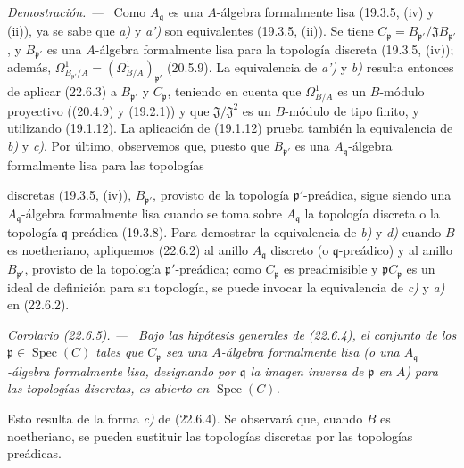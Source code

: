 \documentclass[10pt,oneside]{book}
\makeatletter
\newcommand{\setmanualcurrentlabel}[1]{\def\@currentlabel{#1}}
\newcommand{\oldpage}[2][]{%
  \setcounter{footnote}{0}%
  \marginpar{\scriptsize\textbf{#1}~|~#2}\ignorespaces}
\newenvironment{corollary}[1][]{%
  \setmanualcurrentlabel{#1}\par\medskip\noindent\itshape Corolario (#1). ---\ }{\par}
\newenvironment{proof}{%
  \par\medskip\noindent\textit{Demostración. ---\ }}{\par}
\makeatother
\begin{document}
\begin{proof}
Como $A_{\mathfrak q}$ es una $A$-álgebra formalmente lisa (19.3.5, (iv)
y (ii)), ya se sabe que \emph{a)} y \emph{a')} son equivalentes (19.3.5, (ii)). Se tiene
$C_{\mathfrak p}=B_{\mathfrak p'}/\mathfrak J B_{\mathfrak p'}$, y
$B_{\mathfrak p'}$ es una $A$-álgebra formalmente lisa para la topología
discreta (19.3.5, (iv)); además,
$\Omega^1_{B_{\mathfrak p'}/A}=(\Omega^1_{B/A})_{\mathfrak p'}$ (20.5.9).
La equivalencia de \emph{a')} y \emph{b)} resulta entonces de aplicar (22.6.3) a
$B_{\mathfrak p'}$ y $C_{\mathfrak p}$, teniendo en cuenta que
$\Omega^1_{B/A}$ es un $B$-módulo proyectivo ((20.4.9) y (19.2.1)) y que
$\mathfrak J/\mathfrak J^2$ es un $B$-módulo de tipo finito, y utilizando
(19.1.12). La aplicación de (19.1.12) prueba también la equivalencia de \emph{b)} y \emph{c)}.
Por último, observemos que, puesto que $B_{\mathfrak p'}$ es una
$A_{\mathfrak q}$-álgebra formalmente lisa para las topologías

\oldpage[0\textsubscript{IV-1}]{207}

discretas (19.3.5, (iv)), $B_{\mathfrak p'}$, provisto de la topología
$\mathfrak p'$-preádica, sigue siendo una $A_{\mathfrak q}$-álgebra
formalmente lisa cuando se toma sobre $A_{\mathfrak q}$ la topología
discreta o la topología $\mathfrak q$-preádica (19.3.8). Para demostrar
la equivalencia de \emph{b)} y \emph{d)} cuando $B$ es noetheriano, apliquemos (22.6.2) al
anillo $A_{\mathfrak q}$ discreto (o $\mathfrak q$-preádico) y al anillo
$B_{\mathfrak p'}$, provisto de la topología $\mathfrak p'$-preádica; como
$C_{\mathfrak p}$ es preadmisible y $\mathfrak pC_{\mathfrak p}$ es
un ideal de definición para su topología, se puede invocar la equivalencia de
\emph{c)} y \emph{a)} en (22.6.2).
\end{proof}

\begin{corollary}[22.6.5]
\label{0.22.6.5-es}
Bajo las hipótesis generales de (22.6.4), el conjunto de los
$\mathfrak p\in\operatorname{Spec}(C)$ tales que $C_{\mathfrak p}$ sea una $A$-álgebra
formalmente lisa \textup{(o una $A_{\mathfrak q}$-álgebra formalmente lisa, designando
por $\mathfrak q$ la imagen inversa de $\mathfrak p$ en $A$)}
para las topologías discretas, es abierto en $\operatorname{Spec}(C)$.
\end{corollary}

Esto resulta de la forma \emph{c)} de (22.6.4). Se observará que, cuando $B$ es
noetheriano, se pueden sustituir las topologías discretas por las topologías
preádicas.
\end{document}
